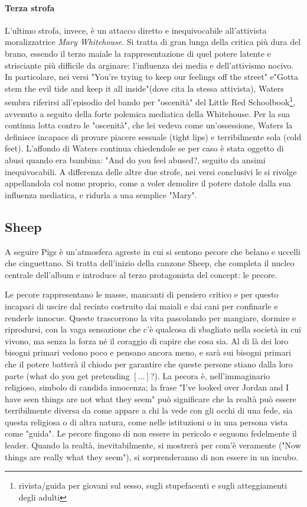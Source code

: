 \documentclass[class=book, crop=false, oneside, 12pt]{standalone}
\begin{document}
    \paragraph{Terza strofa} L'ultimo strofa, invece, è un attacco diretto e inequivocabile all'attivista moralizzatrice \emph{Mary Whitehouse}. Si tratta di gran lunga della critica più dura del brano, essendo il terzo maiale la rappresentazione di quel potere latente e strisciante più difficile da arginare: l'influenza dei media e dell'attivismo nocivo. In particolare, nei versi "You're trying to keep our feelings off the street" e"Gotta stem the evil tide and keep it all inside"(dove cita la stessa attivista), Waters sembra riferirsi all'episodio del bando per "oscenità" del Little Red Schoolbook\footnote{rivista/guida per giovani sul sesso, sugli stupefacenti e sugli atteggiamenti degli adulti}, avvenuto a seguito della forte polemica mediatica della Whitehouse. Per la sua continua lotta contro le "oscenità", che lei vedeva come un'ossessione, Waters la definisce incapace di provare piacere sessuale (tight lips) e terribilmente sola (cold feet). L'affondo di Waters continua chiedendole se per caso è stata oggetto di abusi quando era bambina: "And do you feel abused?, seguito da ansimi inequivocabili. A differenza delle altre due strofe, nei versi conclusivi le si rivolge appellandola col nome proprio, come a voler demolire il potere datole dalla sua influenza mediatica, e ridurla a una semplice "Mary".

    \subsection{Sheep}
    A seguire Pigs è un'atmosfera agreste in cui si sentono pecore che belano e uccelli che cinguettano. Si tratta dell'inizio della canzone Sheep, che completa il nucleo centrale dell'album e introduce al terzo protagonista del concept: le pecore.

    Le pecore rappresentano le masse, mancanti di pensiero critico e per questo incapaci di uscire dal recinto costruito dai maiali e dai cani per confinarle e renderle innocue. Queste trascorrono la vita pascolando per mangiare, dormire e riprodursi, con la vaga sensazione che c'è qualcosa di sbagliato nella società in cui vivono, ma senza la forza né il coraggio di capire che cosa sia. Al di là dei loro bisogni primari vedono poco e pensano ancora meno, e sarà sui bisogni primari che il potere batterà il chiodo per garantire che queste persone stiano dalla loro parte (what do you get pretending \([\ldots]\)?). La pecora è, nell'immaginario religioso, simbolo di candida innocenza; la frase "I've looked over Jordan and I have seen things are not what they seem" può significare che la realtà può essere terribilmente diversa da come appare a chi la vede con gli occhi di una fede, sia questa religiosa o di altra natura, come nelle istituzioni o in una persona vista come "guida". Le pecore fingono di non essere in pericolo e seguono fedelmente il leader. Quando la realtà, inevitabilmente, si mostrerà per com'è veramente ("Now things are really what they seem"), si sorprenderanno di non essere in un incubo.
\end{document}
